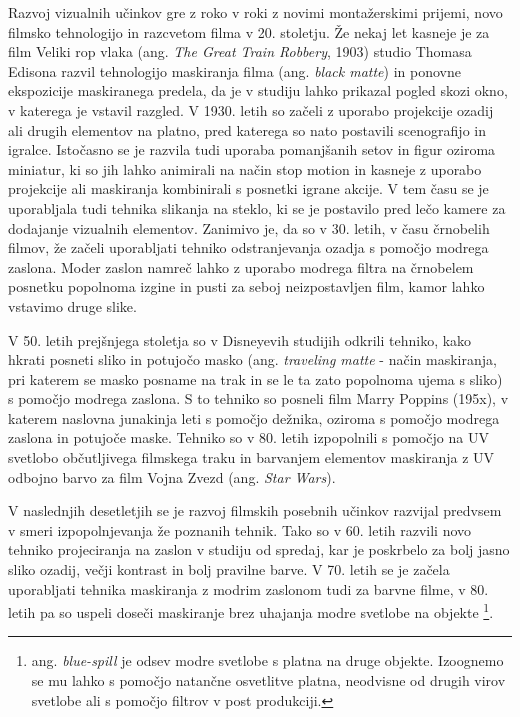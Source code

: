 \documentclass[a4paper, 12pt]{book}
\begin{document}
Razvoj vizualnih učinkov gre z roko v roki z novimi montažerskimi prijemi, novo filmsko tehnologijo in razcvetom filma v 20. stoletju. 
Že nekaj let kasneje je za film Veliki rop vlaka (ang. {\it The Great Train Robbery}, 1903) studio Thomasa Edisona razvil tehnologijo maskiranja filma (ang. {\it black matte}) in ponovne ekspozicije maskiranega predela, da je v studiju lahko prikazal pogled skozi okno, v katerega je vstavil razgled. 
V 1930. letih so začeli z uporabo projekcije ozadij ali drugih elementov na platno, pred katerega so nato postavili scenografijo in igralce. 
Istočasno se je razvila tudi uporaba pomanjšanih setov in figur oziroma miniatur, ki so jih lahko animirali na način stop motion in kasneje z uporabo projekcije ali maskiranja kombinirali s posnetki igrane akcije. %
V tem času se je uporabljala tudi tehnika slikanja na steklo, ki se je postavilo pred lečo kamere za dodajanje vizualnih elementov. 
Zanimivo je, da so v 30. letih, v času črnobelih filmov, že začeli uporabljati tehniko odstranjevanja ozadja s pomočjo modrega zaslona. 
Moder zaslon namreč lahko z uporabo modrega filtra na črnobelem posnetku popolnoma izgine in pusti za seboj neizpostavljen film, kamor lahko vstavimo druge slike. 

V 50. letih prejšnjega stoletja so v Disneyevih studijih odkrili tehniko, kako hkrati posneti sliko in potujočo masko (ang. {\it traveling matte} - način maskiranja, pri katerem se masko posname na trak in se le ta zato popolnoma ujema s sliko) s pomočjo modrega zaslona. 
S to tehniko so posneli film Marry Poppins (195x), v katerem naslovna junakinja leti s pomočjo dežnika, oziroma s pomočjo modrega zaslona in potujoče maske. %
Tehniko so v 80. letih izpopolnili s pomočjo na UV svetlobo občutljivega filmskega traku in barvanjem elementov maskiranja z UV odbojno barvo za film Vojna Zvezd (ang. {\it Star Wars}). 

V naslednjih desetletjih se je razvoj filmskih posebnih učinkov razvijal predvsem v smeri izpopolnjevanja že poznanih tehnik. 
Tako so v 60. letih razvili novo tehniko projeciranja na zaslon v studiju od spredaj, kar je poskrbelo za bolj jasno sliko ozadij, večji kontrast in bolj pravilne barve. 
V 70. letih se je začela uporabljati tehnika maskiranja z modrim zaslonom tudi za barvne filme, v 80. letih pa so uspeli doseči maskiranje brez uhajanja modre svetlobe na objekte
\footnote{ang. {\it blue-spill} je odsev modre svetlobe s platna na druge objekte. 
Izoognemo se mu lahko s pomočjo natančne osvetlitve platna, neodvisne od drugih virov svetlobe ali s pomočjo filtrov v post produkciji.}.
\end{document}
